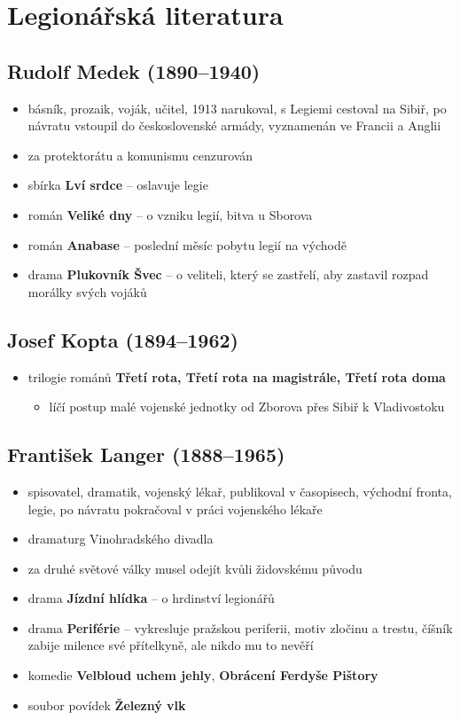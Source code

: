 \section{Legionářská literatura}
\subsection{Rudolf Medek (1890--1940)}
\begin{itemize}
\item básník, prozaik, voják, učitel, 1913 narukoval, s Legiemi cestoval na Sibiř, po návratu vstoupil do československé armády, vyznamenán ve Francii a Anglii
\item za protektorátu a komunismu cenzurován
\item sbírka \textbf{Lví srdce} -- oslavuje legie
\item román \textbf{Veliké dny} -- o vzniku legií, bitva u Sborova
\item román \textbf{Anabase} -- poslední měsíc pobytu legií na východě
\item drama \textbf{Plukovník Švec} -- o veliteli, který se zastřelí, aby zastavil rozpad morálky svých vojáků
\end{itemize}

\subsection{Josef Kopta (1894--1962)}
\begin{itemize}
\item trilogie románů \textbf{Třetí rota, Třetí rota na magistrále, Třetí rota doma}
	\begin{itemize}
	\item líčí postup malé vojenské jednotky od Zborova přes Sibiř k Vladivostoku
	\end{itemize}
\end{itemize}

\subsection{František Langer (1888--1965)}
\begin{itemize}
\item spisovatel, dramatik, vojenský lékař, publikoval v časopisech, východní fronta, legie, po návratu pokračoval v práci vojenského lékaře
\item dramaturg Vinohradského divadla
\item za druhé světové války musel odejít kvůli židovskému původu
\item drama \textbf{Jízdní hlídka} -- o hrdinství legionářů
\item drama \textbf{Periférie} -- vykresluje pražskou periferii, motiv zločinu a trestu, číšník zabije milence své přítelkyně, ale nikdo mu to nevěří
\item komedie \textbf{Velbloud uchem jehly}, \textbf{Obrácení Ferdyše Pištory}
\item soubor povídek \textbf{Železný vlk}
\end{itemize}

